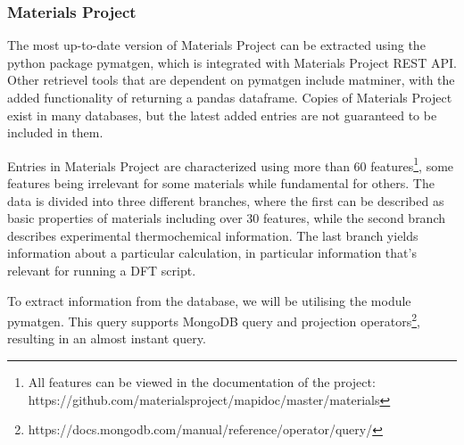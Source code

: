 

\subsubsection{Materials Project}
\label{ssec:materialsproject}

The most up-to-date version of Materials Project can be extracted using the python package pymatgen, which is integrated with Materials Project REST API. Other retrievel tools that are dependent on pymatgen include matminer, with the added functionality of returning a pandas dataframe. Copies of Materials Project exist in many databases, but the latest added entries are not guaranteed to be included in them. %

Entries in Materials Project are characterized using more than 60 features\footnote{All features can be viewed in the documentation of the project: https://github.com/materialsproject/mapidoc/master/materials}, some features being irrelevant for some materials while fundamental for others. The data is divided into three different branches, where the first can be described as basic properties of materials including over $30$ features, while the second branch describes experimental thermochemical information. The last branch yields information about a particular calculation, in particular information that's relevant for running a DFT script.

To extract information from the database, we will be utilising the module pymatgen. This query supports MongoDB query and projection operators\footnote{https://docs.mongodb.com/manual/reference/operator/query/}, resulting in an almost instant query.

